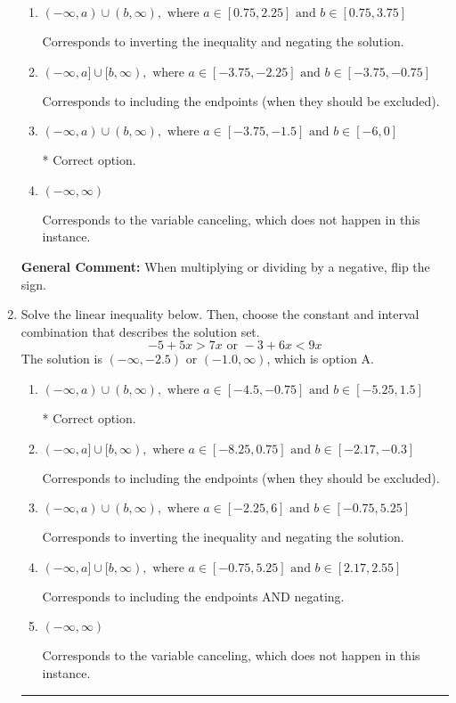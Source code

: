 \documentclass{extbook}[14pt]
\newcommand{\litem}[1]{\item #1

\rule{\textwidth}{0.4pt}}
\begin{document}
\begin{enumerate}
{\begin{enumerate}[label=\Alph*.]
Corresponds to including the endpoints AND negating.
\item \( (-\infty, a) \cup (b, \infty), \text{ where } a \in [0.75, 2.25] \text{ and } b \in [0.75, 3.75] \)

Corresponds to inverting the inequality and negating the solution.
\item \( (-\infty, a] \cup [b, \infty), \text{ where } a \in [-3.75, -2.25] \text{ and } b \in [-3.75, -0.75] \)

Corresponds to including the endpoints (when they should be excluded).
\item \( (-\infty, a) \cup (b, \infty), \text{ where } a \in [-3.75, -1.5] \text{ and } b \in [-6, 0] \)

 * Correct option.
\item \( (-\infty, \infty) \)

Corresponds to the variable canceling, which does not happen in this instance.
\end{enumerate}

\textbf{General Comment:} When multiplying or dividing by a negative, flip the sign.
}
\litem{
Solve the linear inequality below. Then, choose the constant and interval combination that describes the solution set.
\[ -5 + 5 x > 7 x \text{ or } -3 + 6 x < 9 x \]The solution is \( (-\infty, -2.5) \text{ or } (-1.0, \infty) \), which is option A.\begin{enumerate}[label=\Alph*.]
\item \( (-\infty, a) \cup (b, \infty), \text{ where } a \in [-4.5, -0.75] \text{ and } b \in [-5.25, 1.5] \)

 * Correct option.
\item \( (-\infty, a] \cup [b, \infty), \text{ where } a \in [-8.25, 0.75] \text{ and } b \in [-2.17, -0.3] \)

Corresponds to including the endpoints (when they should be excluded).
\item \( (-\infty, a) \cup (b, \infty), \text{ where } a \in [-2.25, 6] \text{ and } b \in [-0.75, 5.25] \)

Corresponds to inverting the inequality and negating the solution.
\item \( (-\infty, a] \cup [b, \infty), \text{ where } a \in [-0.75, 5.25] \text{ and } b \in [2.17, 2.55] \)

Corresponds to including the endpoints AND negating.
\item \( (-\infty, \infty) \)

Corresponds to the variable canceling, which does not happen in this instance.
\end{enumerate}

}
\end{enumerate}
\end{document}
